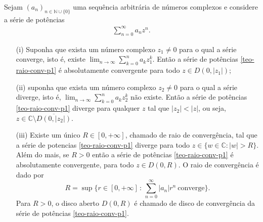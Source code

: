 \begin{teorema}
\label{teo-exist-raio-conv}
Sejam $(a_n)_{n\in\mathbb{N}\cup\{0\}}$ uma sequência arbitrária 
de números complexos e
considere a série de potências 
\begin{align}\label{teo-raio-conv-p1}
\sum_{n=0}^{\infty}a_nz^n.
\end{align}
\begin{itemize}
	\item[(i)] Suponha que exista um número complexo $z_1\neq 0$ para o
	qual a série converge, isto é, existe $\lim_{n\to\infty} \sum_{k=0}^{n}a_kz_1^k$.
	Então a série de potências \eqref{teo-raio-conv-p1} é absolutamente convergente
	para todo $z\in D(0,|z_1|)$;
	
	\item[(ii)] suponha que exista um número complexo $z_2\neq 0$ para o 
	qual a série diverge, isto é, $\lim_{n\to\infty} \sum_{k=0}^{n}a_kz_2^k$
	não existe. Então a série de potências \eqref{teo-raio-conv-p1} diverge para 
	qualquer $z$ tal que $|z_2|<|z|$, ou seja, 
	$z\in \mathbb{C}\setminus\overline{D(0,|z_2|)}$.
	
	\item[(iii)] Existe um único $R\in [0,+\infty]$, chamado de
	raio de convergência, tal que
	a série de potencias \eqref{teo-raio-conv-p1} diverge para todo 
	$z \in \{w\in\mathbb{C}: |w|> R\}$.
	Além do mais, se $R>0$ então a série de potências \eqref{teo-raio-conv-p1} é
	absolutamente convergente, para todo $z\in D(0,R)$.
	O raio de convergência é dado por
	\[
	R = 
	\sup \Big\{r\in [0,+\infty]
	\, :\, 
	\sum_{n=0}^{\infty}|a_n|r^n \ \text{converge}\Big\}.
	\]
	Para $R>0$, o disco aberto $D(0,R)$ é chamado de disco 
 	de convergência da série de potências \eqref{teo-raio-conv-p1}.
\end{itemize}
\end{teorema}


